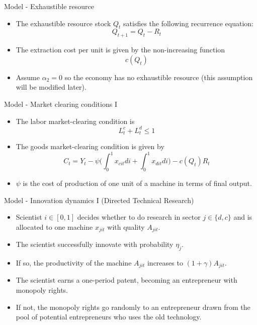 \documentclass[aspectratio=169,xcolor=dvipsnames]{beamer}
\begin{document}
\begin{frame}{Model - Exhaustible resource}
\begin{itemize}
\item The exhaustible resource stock $Q_t$ satisfies the following recurrence equation:
        \begin{equation}
            Q_{t+1} = Q_{t} - R_t
        \end{equation}
\item The extraction cost per unit is given by the non-increasing function
    \begin{equation*}
        c(Q_t)
    \end{equation*}
\item Assume $\alpha_2=0$ so the economy has no exhaustible resource (this assumption will be modified later). 
    \end{itemize}
\end{frame}

\begin{frame}{Model - Market clearing conditions I}
    \begin{itemize}
\item The labor market-clearing condition is
        \begin{equation}
            L_{t}^c + L_{t}^d \leq 1 
        \end{equation}
\item The goods market-clearing condition is given by 
        \begin{equation}
            C_t = Y_t - \psi\bigg( \int_0^1 x_{cit} di + \int_0^1 x_{dit} di \bigg) - c(Q_t)R_t
        \end{equation}
\item $\psi$ is the cost of production of one unit of a machine in terms of final output.
    \end{itemize}
\end{frame}


\begin{frame}{Model - Innovation dynamics I (Directed Technical Research)}
    \begin{itemize}
\item Scientist $i \in [0,1]$ decides whether to do research in sector $j\in \{d,c\}$ and is allocated to one machine $x_{jit}$ with quality $A_{jit}$.
\item The scientist successfully innovate with probability $\eta_j$. 
\item If so, the productivity of the machine $A_{jit}$ increases to $(1+\gamma)A_{jit}$.
\item The scientist earns a one-period patent, becoming an entrepreneur with monopoly rights. 
\item If not, the monopoly rights go randomly to an entrepreneur drawn from the pool of potential entrepreneurs who uses the old technology.
    \end{itemize}
\end{frame}
\end{document}

